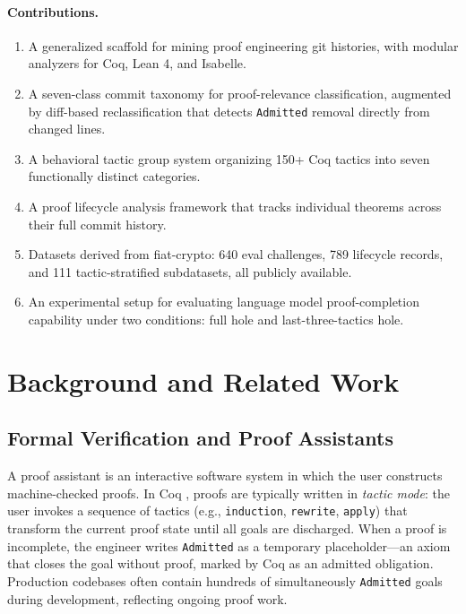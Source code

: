 \documentclass[11pt]{article}
\begin{document}
\paragraph{Contributions.}
\begin{enumerate}
  \item A generalized scaffold for mining proof engineering git histories, with modular analyzers for Coq, Lean 4, and Isabelle.
  \item A seven-class commit taxonomy for proof-relevance classification, augmented by diff-based reclassification that detects \texttt{Admitted} removal directly from changed lines.
  \item A behavioral tactic group system organizing 150+ Coq tactics into seven functionally distinct categories.
  \item A proof lifecycle analysis framework that tracks individual theorems across their full commit history.
  \item Datasets derived from fiat-crypto: 640 eval challenges, 789 lifecycle records, and 111 tactic-stratified subdatasets, all publicly available.
  \item An experimental setup for evaluating language model proof-completion capability under two conditions: full hole and last-three-tactics hole.
\end{enumerate}

\section{Background and Related Work}

\subsection{Formal Verification and Proof Assistants}

A proof assistant is an interactive software system in which the user constructs machine-checked proofs. In Coq \citep{coq2023}, proofs are typically written in \textit{tactic mode}: the user invokes a sequence of tactics (e.g., \texttt{induction}, \texttt{rewrite}, \texttt{apply}) that transform the current proof state until all goals are discharged. When a proof is incomplete, the engineer writes \texttt{Admitted} as a temporary placeholder---an axiom that closes the goal without proof, marked by Coq as an admitted obligation. Production codebases often contain hundreds of simultaneously \texttt{Admitted} goals during development, reflecting ongoing proof work.
\end{document}
